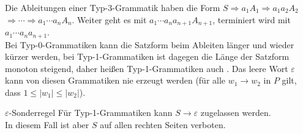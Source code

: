 \begin{Bem}
    Die Ableitungen einer Typ-3-Grammatik haben die Form
    $S \Rightarrow a_1 A_1 \Rightarrow a_1 a_2 A_2$\\
    $\Rightarrow \dotsb \Rightarrow a_1 \dotsb a_n A_n$.
    Weiter geht es mit $a_1 \dotsb a_n a_{n+1} A_{n+1}$,
    terminiert wird mit $a_1 \dotsb a_n a_{n+1}$.\\
    Bei Typ-0-Grammatiken kann die Satzform beim Ableiten länger und wieder
    kürzer werden,
    bei Typ-1-Grammatiken ist dagegen die Länge der Satzform monoton
    steigend, daher heißen Typ-1-Grammatiken auch .
    Das leere Wort $\varepsilon$ kann von diesen Grammatiken nie erzeugt werden
    (für alle $w_1 \rightarrow w_2$ in $P$ gilt, dass $1 \le |w_1| \le |w_2|$).
\end{Bem}

\linie
\pagebreak

\begin{Def}{$\varepsilon$-Sonderregel}
    Für Typ-1-Grammatiken kann $S \rightarrow \varepsilon$ zugelassen werden.\\
    In diesem Fall ist aber $S$ auf allen rechten Seiten verboten.
\end{Def}

